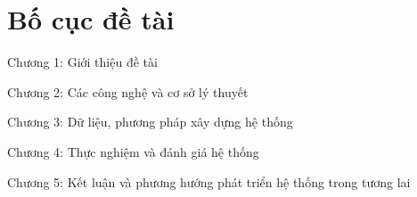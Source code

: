 \section{Bố cục đề tài}
Chương 1: Giới thiệu đề tài 

\vspace{\baselineskip}
\noindent Chương 2: Các công nghệ và cơ sở lý thuyết 

\vspace{\baselineskip}
\noindent Chương 3: Dữ liệu, phương pháp xây dựng hệ thống

\vspace{\baselineskip}
\noindent Chương 4: Thực nghiệm và đánh giá hệ thống

\vspace{\baselineskip}
\noindent Chương 5: Kết luận và phương hướng phát triển hệ thống trong tương lai